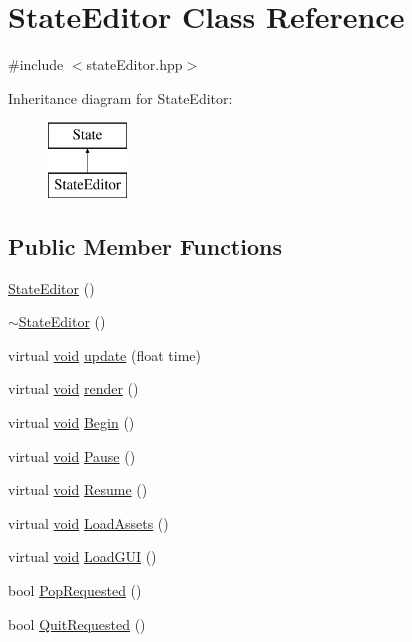 \hypertarget{class_state_editor}{\section{State\-Editor Class Reference}
\label{class_state_editor}
}


{\ttfamily \#include $<$state\-Editor.\-hpp$>$}

Inheritance diagram for State\-Editor\-:\begin{figure}[H]
\begin{center}
\leavevmode
\includegraphics[height=2.000000cm]{class_state_editor}
\end{center}
\end{figure}
\subsection*{Public Member Functions}
\begin{DoxyCompactItemize}
\item 
\hyperlink{class_state_editor_a263454623b291b8171eebc5889445b5e}{State\-Editor} ()
\item 
\hyperlink{class_state_editor_a160e01512099183107b651c44a0d1410}{$\sim$\-State\-Editor} ()
\item 
virtual \hyperlink{_s_d_l__opengles2__gl2ext_8h_ae5d8fa23ad07c48bb609509eae494c95}{void} \hyperlink{class_state_editor_a9446b67f8a03ec57ba9d7226a2d1d3f2}{update} (float time)
\item 
virtual \hyperlink{_s_d_l__opengles2__gl2ext_8h_ae5d8fa23ad07c48bb609509eae494c95}{void} \hyperlink{class_state_editor_a9246837b2af58c5fe769b8b0f0bbf5b9}{render} ()
\item 
virtual \hyperlink{_s_d_l__opengles2__gl2ext_8h_ae5d8fa23ad07c48bb609509eae494c95}{void} \hyperlink{class_state_editor_a677d6795d38aabde9c507fefb08853f3}{Begin} ()
\item 
virtual \hyperlink{_s_d_l__opengles2__gl2ext_8h_ae5d8fa23ad07c48bb609509eae494c95}{void} \hyperlink{class_state_editor_a2d65105b815216bf9d81e02d9edef729}{Pause} ()
\item 
virtual \hyperlink{_s_d_l__opengles2__gl2ext_8h_ae5d8fa23ad07c48bb609509eae494c95}{void} \hyperlink{class_state_editor_af29ad722e62abb7f2268749c28de6221}{Resume} ()
\item 
virtual \hyperlink{_s_d_l__opengles2__gl2ext_8h_ae5d8fa23ad07c48bb609509eae494c95}{void} \hyperlink{class_state_editor_a98d3c7a143dbc80aa453d3d4a13873de}{Load\-Assets} ()
\item 
virtual \hyperlink{_s_d_l__opengles2__gl2ext_8h_ae5d8fa23ad07c48bb609509eae494c95}{void} \hyperlink{class_state_editor_abcde29227330049f5428d08b3f4da63c}{Load\-G\-U\-I} ()
\item 
bool \hyperlink{class_state_editor_a4089bbc03de0300a823ce01d70178edc}{Pop\-Requested} ()
\item 
bool \hyperlink{class_state_editor_afaec9a4eb834d1051019078d8c55b95b}{Quit\-Requested} ()
\end{DoxyCompactItemize}
